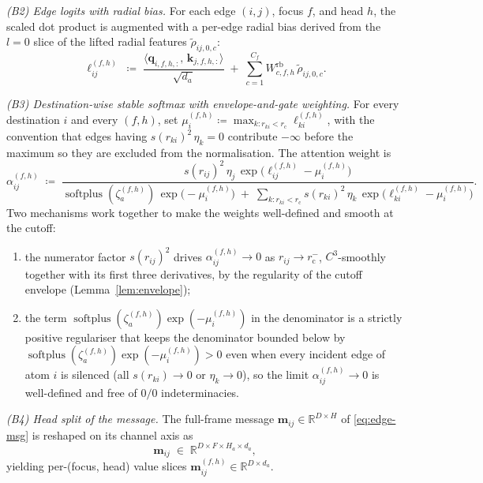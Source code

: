 \documentclass[11pt,a4paper]{article}
\DeclareMathOperator{\softplus}{softplus}
\newcommand{\R}{\mathbb{R}}
\newcommand{\bq}{\bm{q}}
\newcommand{\bk}{\bm{k}}
\newcommand{\rcut}{r_{\mathrm{c}}}
\theoremstyle{plain}
\theoremstyle{definition}
\theoremstyle{remark}
\begin{document}
\emph{(B2) Edge logits with radial bias.}
For each edge $(i,j)$, focus $f$, and head $h$, the scaled dot product is augmented with a per-edge radial bias derived from the $l=0$ slice of the lifted radial features $\widetilde\rho_{ij,0,c}$:
\begin{equation}\label{eq:logit}
    \ell_{ij}^{(f,h)} \;\coloneqq\; \frac{\langle \bq_{i,f,h,:},\,\bk_{j,f,h,:}\rangle}{\sqrt{d_a}}
    \;+\; \sum_{c=1}^{C_f}W^{\mathrm{rb}}_{c,f,h}\,\widetilde\rho_{ij,0,c}.
\end{equation}

\emph{(B3) Destination-wise stable softmax with envelope-and-gate weighting.}
For every destination $i$ and every $(f,h)$, set $\mu_i^{(f,h)}\coloneqq\max_{k:r_{ki}<\rcut}\ell_{ki}^{(f,h)}$, with the convention that edges having $s(r_{ki})^2\,\eta_k=0$ contribute $-\infty$ before the maximum so they are excluded from the normalisation.
The attention weight is
\begin{equation}\label{eq:attw}
    \alpha_{ij}^{(f,h)} \;\coloneqq\;
    \frac{s(r_{ij})^2\,\eta_j\,\exp\!\bigl(\ell_{ij}^{(f,h)}-\mu_i^{(f,h)}\bigr)}
    {\softplus(\zeta_a^{(f,h)})\,\exp\!\bigl(-\mu_i^{(f,h)}\bigr)\;+\;\displaystyle\sum_{k:r_{ki}<\rcut}s(r_{ki})^2\,\eta_k\,\exp\!\bigl(\ell_{ki}^{(f,h)}-\mu_i^{(f,h)}\bigr)}.
\end{equation}
Two mechanisms work together to make the weights well-defined and smooth at the cutoff:
\begin{enumerate}[leftmargin=2em,label=(\roman*)]
    \item the numerator factor $s(r_{ij})^2$ drives $\alpha_{ij}^{(f,h)}\to 0$ as
          $r_{ij}\to\rcut^{-}$, $C^3$-smoothly together with its first three derivatives,
          by the regularity of the cutoff envelope (Lemma~\ref{lem:envelope});
    \item the term $\softplus(\zeta_a^{(f,h)})\exp(-\mu_i^{(f,h)})$ in the denominator is
          a strictly positive regulariser that keeps the denominator bounded below by
          $\softplus(\zeta_a^{(f,h)})\exp(-\mu_i^{(f,h)})>0$ even when every incident
          edge of atom $i$ is silenced (all $s(r_{ki})\to 0$ or $\eta_k\to 0$), so the
          limit $\alpha_{ij}^{(f,h)}\to 0$ is well-defined and free of $0/0$
          indeterminacies.
\end{enumerate}

\emph{(B4) Head split of the message.}
The full-frame message $\bm{m}_{ij}\in\R^{D\times H}$ of \eqref{eq:edge-msg} is reshaped on its channel axis as
\begin{equation}\label{eq:m-head-split}
    \bm{m}_{ij}\;\in\;\R^{D\times F\times H_a\times d_a},
\end{equation}
yielding per-(focus, head) value slices $\bm{m}_{ij}^{(f,h)}\in\R^{D\times d_a}$.
\end{document}
